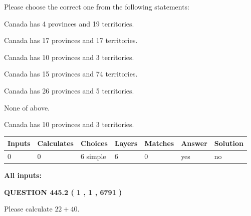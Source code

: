 \documentclass[12pt]{article}
\begin{document}
  
Please choose the correct one from the following statements:
 
 
Canada has   4 provinces and  19 territories.
 
 
Canada has  17 provinces and  17 territories.
 
 
Canada has 10  provinces and 3 territories.
 
 
Canada has  15 provinces and  74 territories.
 
 
Canada has  26 provinces and  5 territories.
 
 
 None of above.
 
 
\noindent{}
 
 
Canada has 10  provinces and 3 territories.
 
 
\noindent{}
 
 
   
   
   
   
\noindent\begin{tabular}{|l|l|l|l|l|l|l|}
 \hline
Inputs & Calculates & Choices & Layers & Matches & Answer & Solution \\ \hline
 0  & 
 0  & 
 6
  simple  
  & 
 6  & 
 0  & 
  yes & 
  no 
  \\ \hline
 \end{tabular}
   
   
   
   
\noindent{}
   
   
   
   
\noindent\vspace{0.1in}\hspace{-0.08in} {\textbf{\Large{All inputs: }}}
   
   
  
\vspace{0.2in}
  
{\textbf{\Large{QUESTION
445.2 
 ( 1 , 1 , 6791 )
}}}
  
  
 
Please calculate $ %
22 +  %
40 $.
 
 
 
\end{document}
